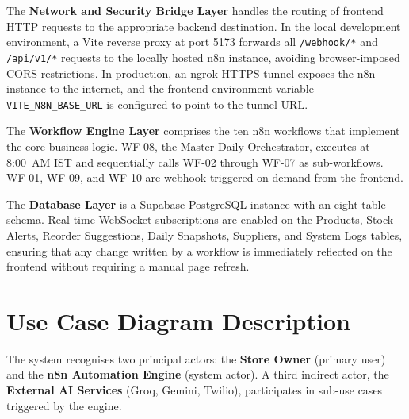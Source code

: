 The \textbf{Network and Security Bridge Layer} handles the routing of frontend HTTP requests to
the appropriate backend destination. In the local development environment, a Vite reverse proxy
at port 5173 forwards all \texttt{/webhook/*} and \texttt{/api/v1/*} requests to the locally
hosted n8n instance, avoiding browser-imposed CORS restrictions. In production, an ngrok HTTPS
tunnel exposes the n8n instance to the internet, and the frontend environment variable
\texttt{VITE\_N8N\_BASE\_URL} is configured to point to the tunnel URL.

The \textbf{Workflow Engine Layer} comprises the ten n8n workflows that implement the core
business logic. WF-08, the Master Daily Orchestrator, executes at 8:00~AM IST and sequentially
calls WF-02 through WF-07 as sub-workflows. WF-01, WF-09, and WF-10 are webhook-triggered on
demand from the frontend.

The \textbf{Database Layer} is a Supabase PostgreSQL instance with an eight-table schema. Real-time
WebSocket subscriptions are enabled on the Products, Stock Alerts, Reorder Suggestions, Daily
Snapshots, Suppliers, and System Logs tables, ensuring that any change written by a workflow is
immediately reflected on the frontend without requiring a manual page refresh.

\section{Use Case Diagram Description}

The system recognises two principal actors: the \textbf{Store Owner} (primary user) and the
\textbf{n8n Automation Engine} (system actor). A third indirect actor, the \textbf{External AI
Services} (Groq, Gemini, Twilio), participates in sub-use cases triggered by the engine.

